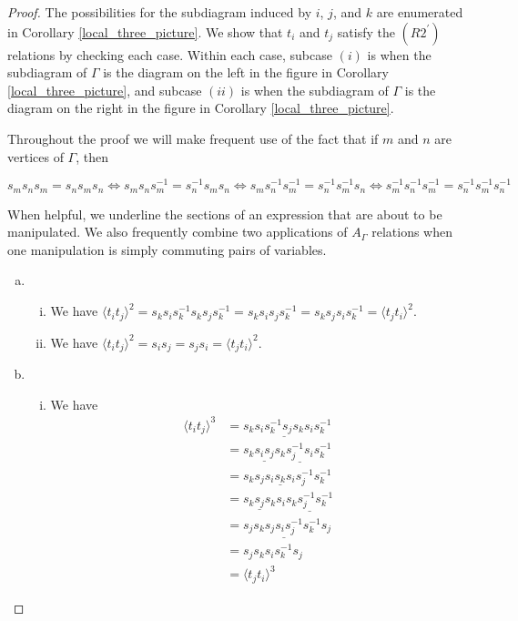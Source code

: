 \documentclass[11pt]{amsart}
\theoremstyle{definition}
\begin{document}
\begin{proof}
The possibilities for the subdiagram induced by $i$, $j$, and $k$ are enumerated in Corollary \ref{local_three_picture}.  We show that $t_i$ and $t_j$ satisfy the $(R2^\prime)$ relations by checking each case.  Within each case, subcase $(i)$ is when the subdiagram of $\Gamma$ is the diagram on the left in the figure in Corollary \ref{local_three_picture}, and subcase $(ii)$ is when the subdiagram of $\Gamma$ is the diagram on the right in the figure in Corollary \ref{local_three_picture}.

Throughout the proof we will make frequent use of the fact that if $m$ and $n$ are vertices of $\Gamma$, then

$$s_ms_ns_m = s_ns_ms_n \Leftrightarrow s_ms_ns_m^{-1} = s_n^{-1}s_ms_n \Leftrightarrow s_ms_n^{-1}s_m^{-1} = s_n^{-1}s_m^{-1}s_n \Leftrightarrow s_m^{-1}s_n^{-1}s_m^{-1} = s_n^{-1}s_m^{-1}s_n^{-1}$$

When helpful, we underline the sections of an expression that are about to be manipulated. We also frequently combine two applications of $A_{\Gamma}$ relations when one manipulation is simply commuting pairs of variables.


\begin{enumerate}[a)]
\item
\begin{enumerate}[i)]
\item We have $\langle t_it_j \rangle^{2} = s_ks_is_k^{-1}s_ks_js_k^{-1} = s_ks_is_js_k^{-1} = s_ks_js_is_k^{-1} = \langle t_jt_i \rangle^{2}$.
\item We have $\langle t_it_j \rangle^{2} = s_is_j = s_js_i = \langle t_jt_i \rangle^{2}$.
\end{enumerate}
\item
\begin{enumerate}[i)]
\item We have
\begin{align*}
\langle t_it_j \rangle^{3} &= s_ks_i\underline{s_k^{-1}s_js_k}s_is_k^{-1}\\
&= s_k\underline{s_is_j}s_k\underline{s_j^{-1}s_i}s_k^{-1}\\
&= s_ks_j\underline{s_is_ks_i}s_j^{-1}s_k^{-1}\\
&= \underline{s_ks_js_k}s_i\underline{s_ks_j^{-1}s_k^{-1}}\\
&= s_js_k\underline{s_js_is_j^{-1}}s_k^{-1}s_j\\
&= s_js_ks_is_k^{-1}s_j\\
&= \langle t_jt_i \rangle^{3}
\end{align*}


\end{enumerate}
\end{enumerate}
\end{proof}
\end{document}
